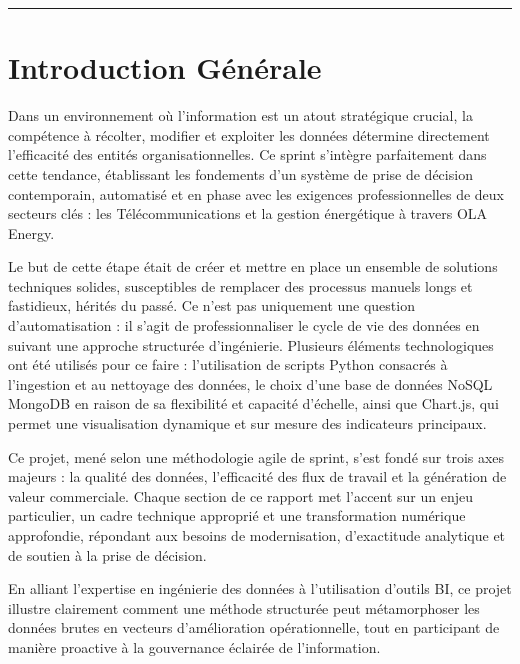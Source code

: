 \documentclass[a4paper,11pt]{report}
\begin{document}
\vspace{1cm}

\noindent
\textcolor{gray!70}{\rule{\textwidth}{0.4pt}}

\newpage


\section*{Introduction Générale}

Dans un environnement où l'information est un atout stratégique crucial, la compétence à récolter, modifier et exploiter les données détermine directement l'efficacité des entités organisationnelles. Ce sprint s'intègre parfaitement dans cette tendance, établissant les fondements d'un système de prise de décision contemporain, automatisé et en phase avec les exigences professionnelles de deux secteurs clés : les Télécommunications et la gestion énergétique à travers OLA Energy.

Le but de cette étape était de créer et mettre en place un ensemble de solutions techniques solides, susceptibles de remplacer des processus manuels longs et fastidieux, hérités du passé. Ce n'est pas uniquement une question d'automatisation : il s'agit de professionnaliser le cycle de vie des données en suivant une approche structurée d'ingénierie. Plusieurs éléments technologiques ont été utilisés pour ce faire : l'utilisation de scripts Python consacrés à l'ingestion et au nettoyage des données, le choix d'une base de données NoSQL MongoDB en raison de sa flexibilité et capacité d'échelle, ainsi que Chart.js, qui permet une visualisation dynamique et sur mesure des indicateurs principaux.

Ce projet, mené selon une méthodologie agile de sprint, s'est fondé sur trois axes majeurs : la qualité des données, l'efficacité des flux de travail et la génération de valeur commerciale. Chaque section de ce rapport met l'accent sur un enjeu particulier, un cadre technique approprié et une transformation numérique approfondie, répondant aux besoins de modernisation, d'exactitude analytique et de soutien à la prise de décision.

En alliant l'expertise en ingénierie des données à l'utilisation d'outils BI, ce projet illustre clairement comment une méthode structurée peut métamorphoser les données brutes en vecteurs d'amélioration opérationnelle, tout en participant de manière proactive à la gouvernance éclairée de l'information.
\end{document}
